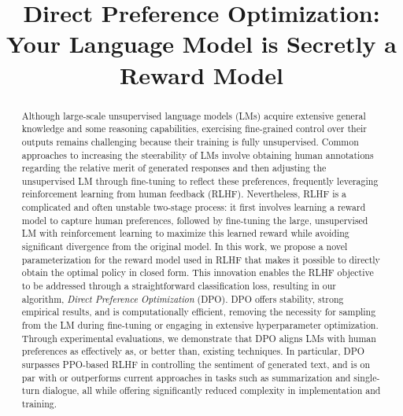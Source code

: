 \title{Direct Preference Optimization: Your Language Model is Secretly a Reward Model}

\begin{abstract}
Although large-scale unsupervised language models (LMs) acquire extensive general knowledge and some reasoning capabilities, exercising fine-grained control over their outputs remains challenging because their training is fully unsupervised. Common approaches to increasing the steerability of LMs involve obtaining human annotations regarding the relative merit of generated responses and then adjusting the unsupervised LM through fine-tuning to reflect these preferences, frequently leveraging reinforcement learning from human feedback (RLHF). Nevertheless, RLHF is a complicated and often unstable two-stage process: it first involves learning a reward model to capture human preferences, followed by fine-tuning the large, unsupervised LM with reinforcement learning to maximize this learned reward while avoiding significant divergence from the original model. In this work, we propose a novel parameterization for the reward model used in RLHF that makes it possible to directly obtain the optimal policy in closed form. This innovation enables the RLHF objective to be addressed through a straightforward classification loss, resulting in our algorithm, \textit{Direct Preference Optimization} (DPO). DPO offers stability, strong empirical results, and is computationally efficient, removing the necessity for sampling from the LM during fine-tuning or engaging in extensive hyperparameter optimization. Through experimental evaluations, we demonstrate that DPO aligns LMs with human preferences as effectively as, or better than, existing techniques. In particular, DPO surpasses PPO-based RLHF in controlling the sentiment of generated text, and is on par with or outperforms current approaches in tasks such as summarization and single-turn dialogue, all while offering significantly reduced complexity in implementation and training.
\end{abstract}

